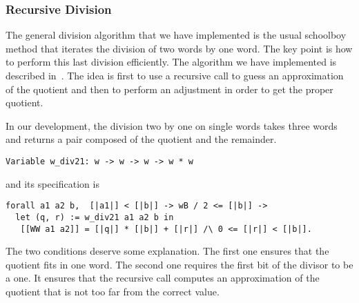 \subsubsection{Recursive Division}
The general division algorithm that we have implemented is the usual schoolboy 
method that iterates the division of two words by one word. 
The key point is how to perform this last division efficiently. 
The algorithm we have implemented is described in~\cite{RecDiv}.
The idea is first to use a recursive call to guess an approximation 
of the quotient and  then to perform an adjustment in order to get the proper quotient.

In our development, the division two by one on single words takes
three words and returns a pair composed of the quotient and the remainder.
\begin{verbatim}
Variable w_div21: w -> w -> w -> w * w
\end{verbatim}
and its specification is 
\begin{verbatim}
forall a1 a2 b,  [|a1|] < [|b|] -> wB / 2 <= [|b|] -> 
  let (q, r) := w_div21 a1 a2 b in
   [[WW a1 a2]] = [|q|] * [|b|] + [|r|] /\ 0 <= [|r|] < [|b|].
\end{verbatim}
The two conditions deserve some explanation.
The first one ensures that the quotient fits in one word.
The second one requires the first bit of the divisor to be a 
one. It ensures that the recursive call computes an approximation 
of the quotient that is not too far from the correct value.

